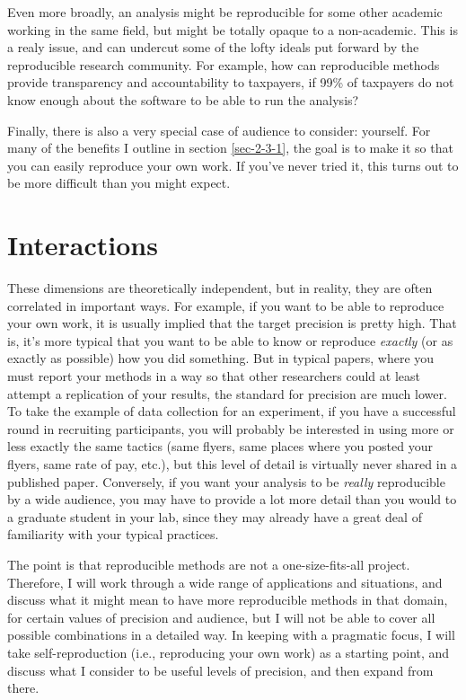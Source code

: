 \documentclass{book}
\begin{document}
Even more broadly, an analysis might be reproducible for some other academic working in the same field, but might be totally opaque to a non-academic.  This is a realy issue, and can undercut some of the lofty ideals put forward by the reproducible research community.  For example, how can reproducible methods provide transparency and accountability to taxpayers, if 99\% of taxpayers do not know enough about the software to be able to run the analysis?

Finally, there is also a very special case of audience to consider: yourself.  For many of the benefits I outline in section \ref{sec-2-3-1}, the goal is to make it so that you can easily reproduce your own work.  If you've never tried it, this turns out to be more difficult than you might expect.
\section{Interactions}
\label{sec-3-4}

These dimensions are theoretically independent, but in reality, they are often correlated in important ways.  For example, if you want to be able to reproduce your own work, it is usually implied that the target precision is pretty high. That is, it's more typical that you want to be able to know or reproduce \emph{exactly} (or as exactly as possible) how you did something.  But in typical papers, where you must report your methods in a way so that other researchers could at least attempt a replication of your results, the standard for precision are much lower. To take the example of data collection for an experiment, if you have a successful round in recruiting participants, you will probably be interested in using more or less exactly the same tactics (same flyers, same places where you posted your flyers, same rate of pay, etc.), but this level of detail is virtually never shared in a published paper.  Conversely, if you want your analysis to be \emph{really} reproducible by a wide audience, you may have to provide a lot more detail than you would to a graduate student in your lab, since they may already have a great deal of familiarity with your typical practices. 

The point is that reproducible methods are not a one-size-fits-all project. Therefore, I will work through a wide range of applications and situations, and discuss what it might mean to have more reproducible methods in that domain, for certain values of precision and audience, but I will not be able to cover all possible combinations in a detailed way. In keeping with a pragmatic focus, I will take self-reproduction (i.e., reproducing your own work) as a starting point, and discuss what I consider to be useful levels of precision, and then expand from there. 
\end{document}

